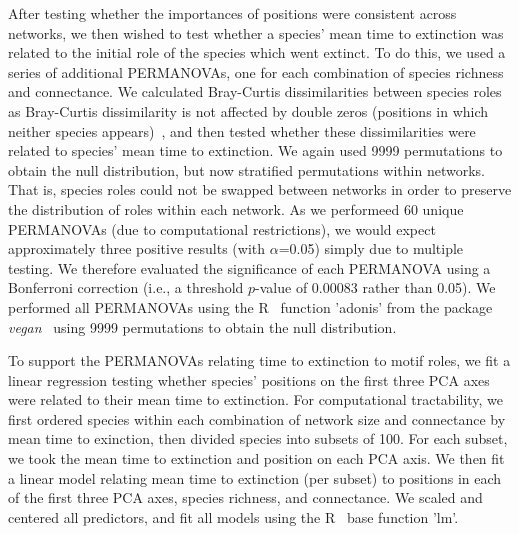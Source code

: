 \documentclass[12pt]{article}
\begin{document}
			After testing whether the importances of positions were consistent across networks, we then wished to test whether a species' mean time to extinction was related to the initial role of the species which went extinct. To do this, we used a series of additional PERMANOVAs,  one for each combination of species richness and connectance. We calculated Bray-Curtis dissimilarities between species roles as Bray-Curtis dissimilarity is not affected by double zeros (positions in which neither species appears)~\citep{Baker2015,Cirtwill2015}, and then tested whether these dissimilarities were related to species' mean time to extinction. We again used 9999 permutations to obtain the null distribution, but now stratified permutations within networks. That is, species roles could not be swapped between networks in order to preserve the distribution of roles within each network. As we performeed 60 unique PERMANOVAs (due to computational restrictions), we would expect approximately three positive results (with $\alpha$=0.05) simply due to multiple testing. We therefore evaluated the significance of each PERMANOVA using a Bonferroni correction (i.e., a threshold $p$-value of 0.00083 rather than 0.05). We performed all PERMANOVAs using the R~\citep{R} function 'adonis' from the package \emph{vegan}~\citep{vegan} using 9999 permutations to obtain the null  distribution.



			To support the PERMANOVAs relating time to extinction to motif roles, we fit a linear regression testing whether species' positions on the first three PCA axes were related to their mean time to extinction. For computational tractability, we first ordered species within each combination of network size and connectance by mean time to exinction, then divided species into subsets of 100. For each subset, we took the mean time to extinction and position on each PCA axis. We then fit a linear model relating mean time to extinction (per subset) to positions in each of the first three PCA axes, species richness, and connectance. We scaled and centered all predictors, and fit all models using the R~\citep{R} base function 'lm'.
\end{document}
